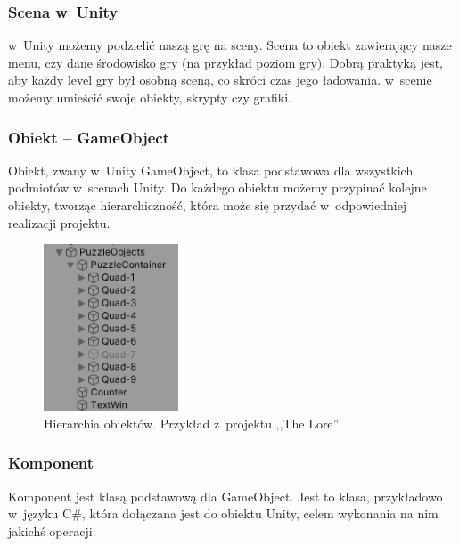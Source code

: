\documentclass[oneside,polski,logo]{amuthesis}
\begin{document}
\subsubsection{Scena w~Unity}
\par w~Unity możemy podzielić naszą grę na sceny. Scena to obiekt zawierający nasze menu, czy dane środowisko gry (na przykład poziom gry). Dobrą praktyką jest, aby każdy level gry był osobną sceną, co skróci czas jego ładowania. w~scenie możemy umieścić swoje obiekty, skrypty czy grafiki. \cite{scena}

\subsubsection{Obiekt – GameObject}
\label{sec:gameobject}
\par Obiekt, zwany w~Unity GameObject, to klasa podstawowa dla wszystkich podmiotów w~scenach Unity. Do każdego obiektu możemy przypinać kolejne obiekty, tworząc hierarchiczność, która może się przydać w~odpowiedniej realizacji projektu. \cite{gameobject}

\begin{figure}[h]
\centering
\includegraphics[width=4cm]{images/tyrek/hierarchia.png}
\caption{Hierarchia obiektów. Przykład z~projektu ,,The Lore''}
\end{figure}

\subsubsection{Komponent}
\label{sec:komponent}
\par Komponent jest klasą podstawową dla GameObject. Jest to klasa, przykładowo w~języku C\#, która dołączana jest do obiektu Unity, celem wykonania na nim jakichś operacji. \cite{komponent}
\end{document}
